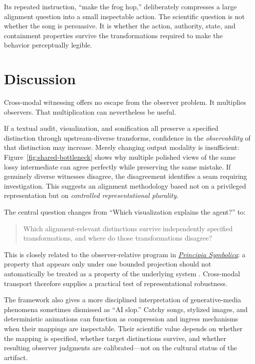 \documentclass[11pt]{article}
\begin{document}
Its repeated instruction, ``make the frog hop,'' deliberately compresses a large alignment question into a small inspectable action. The scientific question is not whether the song is persuasive. It is whether the action, authority, state, and containment properties survive the transformations required to make the behavior perceptually legible.

\section{Discussion}
Cross-modal witnessing offers no escape from the observer problem. It multiplies observers. That multiplication can nevertheless be useful.

If a textual audit, visualization, and sonification all preserve a specified distinction through upstream-diverse transforms, confidence in the \emph{observability} of that distinction may increase. Merely changing output modality is insufficient: Figure~\ref{fig:shared-bottleneck} shows why multiple polished views of the same lossy intermediate can agree perfectly while preserving the same mistake. If genuinely diverse witnesses disagree, the disagreement identifies a seam requiring investigation. This suggests an alignment methodology based not on a privileged representation but on \emph{controlled representational plurality}.

The central question changes from ``Which visualization explains the agent?'' to:
\begin{quote}
Which alignment-relevant distinctions survive independently specified transformations, and where do those transformations disagree?
\end{quote}
This is closely related to the observer-relative program in \href{https://paultiffany.github.io/Principia-Symbolica/}{\emph{Principia Symbolica}}: a property that appears only under one bounded projection should not automatically be treated as a property of the underlying system \citep{tiffany2026principia}. Cross-modal transport therefore supplies a practical test of representational robustness.

The framework also gives a more disciplined interpretation of generative-media phenomena sometimes dismissed as ``AI slop.'' Catchy songs, stylized images, and deterministic animations can function as compression and ingress mechanisms when their mappings are inspectable. Their scientific value depends on whether the mapping is specified, whether target distinctions survive, and whether resulting observer judgments are calibrated---not on the cultural status of the artifact.
\end{document}
